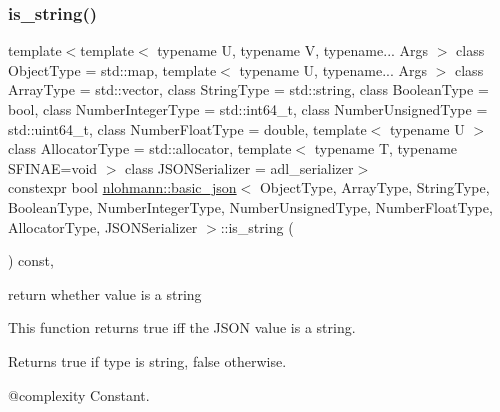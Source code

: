 \mbox{\label{classnlohmann_1_1basic__json_a69b596a4a6683b362095c9a139637396}} 
\subsubsection{\texorpdfstring{is\_string()}{is\_string()}}
{\footnotesize\ttfamily template$<$template$<$ typename U, typename V, typename... Args $>$ class Object\+Type = std\+::map, template$<$ typename U, typename... Args $>$ class Array\+Type = std\+::vector, class String\+Type  = std\+::string, class Boolean\+Type  = bool, class Number\+Integer\+Type  = std\+::int64\+\_\+t, class Number\+Unsigned\+Type  = std\+::uint64\+\_\+t, class Number\+Float\+Type  = double, template$<$ typename U $>$ class Allocator\+Type = std\+::allocator, template$<$ typename T, typename S\+F\+I\+N\+A\+E=void $>$ class J\+S\+O\+N\+Serializer = adl\+\_\+serializer$>$ \\
constexpr bool \mbox{\hyperlink{classnlohmann_1_1basic__json}{nlohmann\+::basic\+\_\+json}}$<$ Object\+Type, Array\+Type, String\+Type, Boolean\+Type, Number\+Integer\+Type, Number\+Unsigned\+Type, Number\+Float\+Type, Allocator\+Type, J\+S\+O\+N\+Serializer $>$\+::is\+\_\+string (\begin{DoxyParamCaption}{ }\end{DoxyParamCaption}) const\hspace{0.3cm}{\ttfamily [inline]}, {\ttfamily [noexcept]}}



return whether value is a string 

This function returns true iff the J\+S\+ON value is a string.

\begin{DoxyReturn}{Returns}
{\ttfamily true} if type is string, {\ttfamily false} otherwise.
\end{DoxyReturn}
@complexity Constant.

